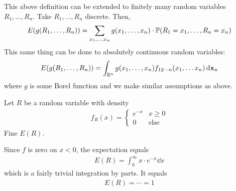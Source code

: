 \begin{lemma}
    This above definition can be extended to finitely many random variables $R_1, \ldots, R_n$. Take $R_1, \ldots, R_n$ discrete. Then,
    \begin{align}
        E(g(R_1, \ldots, R_n)) = \sum_{x_1, \ldots, x_n} g(x_1, \ldots, x_n) \cdot \mathbb{P}(R_1 = x_1, \ldots, R_n = x_n)
    \end{align}
    This same thing can be done to absolutely continuous random variables:
    \begin{align}
        E(g(R_1, \ldots, R_n)) = \int_{\mathbb{R}^n} g(x_1, \ldots, x_n) f_{12\cdots n}(x_1, \ldots x_n) \dd{\vb{x}_n}
    \end{align}
    where $g$ is some Borel function and we make similar assumptions as above.
\end{lemma}

\begin{example}
    Let $R$ be a random variable with density
    \begin{align}
        f_R(x) = \begin{cases}
            e^{-x} & x \ge 0\\
            0 & \text{else}
        \end{cases}
    \end{align}
    Fine $E(R)$.
\end{example}
\begin{solution}
    Since $f$ is zero on $x < 0$, the expectation equals
    \begin{align}
        E(R) = \int_0^\infty x \cdot e^{-x} \dd{x}
    \end{align}
    which is a fairly trivial integration by parts. It equals
    \begin{align}
        E(R) = \cdots = 1
    \end{align}
\end{solution}

